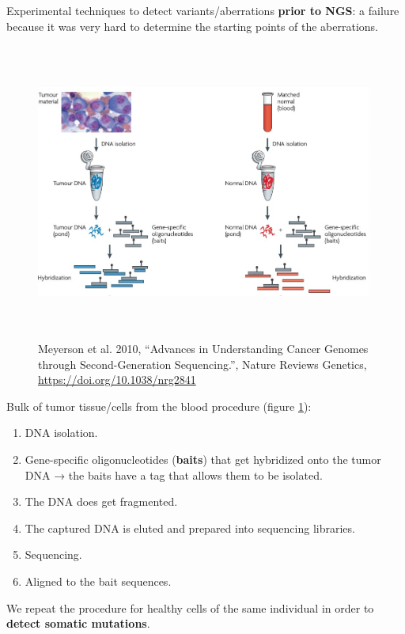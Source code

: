 Experimental techniques to detect variants/aberrations \textbf{prior to NGS}: a
failure because it was very hard to determine the starting points of the
aberrations. %

\begin{figure}[H]
  \includegraphics[width=6.18343in,height=3.84729in]{image9.jpeg}
  \centering
  \caption{Meyerson et al. 2010, ``Advances in Understanding Cancer Genomes
  through Second-Generation Sequencing.'', Nature Reviews Genetics,
  \url{https://doi.org/10.1038/nrg2841}}
  \label{fig: DNA variants}
\end{figure}

Bulk of tumor tissue/cells from the blood procedure (figure \ref{fig: DNA variants}):


\begin{enumerate}
\def\labelenumi{\arabic{enumi})}
\item
  DNA isolation.
\item
  Gene-specific oligonucleotides (\textbf{baits}) that get hybridized onto the
  tumor DNA → the baits have a tag that allows them to be isolated.
\item
  The DNA does get fragmented.
\item
  The captured DNA is eluted and prepared into sequencing libraries.
\item
  Sequencing.
\item
  Aligned to the bait sequences.
\end{enumerate}


We repeat the procedure for healthy cells of the same individual in order to
\textbf{detect somatic mutations}.


